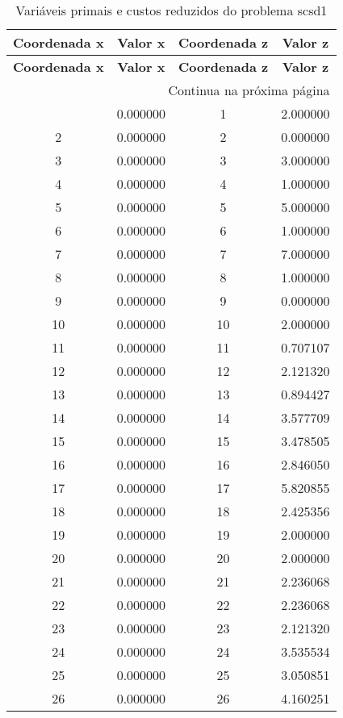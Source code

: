 \documentclass[12pt]{article}
\begin{document}
\begin{longtable}{@{}cccc@{}}
\caption{Variáveis primais e custos reduzidos do problema scsd1} \\
\toprule
\textbf{Coordenada x} & \textbf{Valor x} & \textbf{Coordenada z} & \textbf{Valor z} \\
\midrule
\endfirsthead

\toprule
\textbf{Coordenada x} & \textbf{Valor x} & \textbf{Coordenada z} & \textbf{Valor z} \\
\midrule
\endhead

\midrule \multicolumn{4}{r}{{Continua na próxima página}} \\ \midrule
\endfoot

\bottomrule
\endlastfoot
1 & 0.000000 & 1 & 2.000000 \\
2 & 0.000000 & 2 & 0.000000 \\
3 & 0.000000 & 3 & 3.000000 \\
4 & 0.000000 & 4 & 1.000000 \\
5 & 0.000000 & 5 & 5.000000 \\
6 & 0.000000 & 6 & 1.000000 \\
7 & 0.000000 & 7 & 7.000000 \\
8 & 0.000000 & 8 & 1.000000 \\
9 & 0.000000 & 9 & 0.000000 \\
10 & 0.000000 & 10 & 2.000000 \\
11 & 0.000000 & 11 & 0.707107 \\
12 & 0.000000 & 12 & 2.121320 \\
13 & 0.000000 & 13 & 0.894427 \\
14 & 0.000000 & 14 & 3.577709 \\
15 & 0.000000 & 15 & 3.478505 \\
16 & 0.000000 & 16 & 2.846050 \\
17 & 0.000000 & 17 & 5.820855 \\
18 & 0.000000 & 18 & 2.425356 \\
19 & 0.000000 & 19 & 2.000000 \\
20 & 0.000000 & 20 & 2.000000 \\
21 & 0.000000 & 21 & 2.236068 \\
22 & 0.000000 & 22 & 2.236068 \\
23 & 0.000000 & 23 & 2.121320 \\
24 & 0.000000 & 24 & 3.535534 \\
25 & 0.000000 & 25 & 3.050851 \\
26 & 0.000000 & 26 & 4.160251 \\

\end{longtable}
\end{document}

